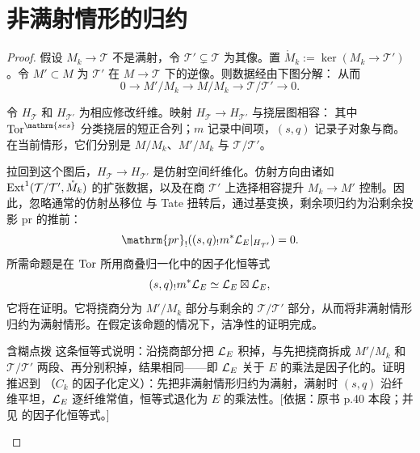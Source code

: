 \section{非满射情形的归约}\label{sec:6.6}
\begin{proof}
假设 $M_k\to\mathcal T$ 不是满射，令 $\mathcal T'\subsetneq\mathcal T$ 为其像。置 $\mathring M_k:=\ker(M_k\to\mathcal T')$。令 $M'\subset M$ 为 $\mathcal T'$ 在 $M\to\mathcal T$ 下的逆像。则数据经由下图分解：
从而
\[0\longrightarrow M'/M_k\longrightarrow M/M_k\longrightarrow\mathcal T/\mathcal T'\longrightarrow0.\]

令 $H_{\mathcal T}$ 和 $H_{\mathcal T'}$ 为相应修改纤维。映射 $H_{\mathcal T}\to H_{\mathcal T'}$ 与挠层图相容：
其中 $\Tor^{\mathrm{ses}}$ 分类挠层的短正合列；$m$ 记录中间项，$(s,q)$ 记录子对象与商。在当前情形，它们分别是 $M/M_k$、$M'/M_k$ 与 $\mathcal T/\mathcal T'$。

拉回到这个图后，$H_{\mathcal T}\to H_{\mathcal T'}$ 是仿射空间纤维化。仿射方向由诸如 $\operatorname{Ext}^1(\mathcal T/\mathcal T',\mathring M_k)$ 的扩张数据，以及在商 $\mathcal T'$ 上选择相容提升 $M_k\to M'$ 控制。因此，忽略通常的仿射丛移位
与 Tate 扭转后，通过基变换，剩余项归约为沿剩余投影 $\mathrm{pr}$ 的推前：
\[\mathrm{pr}_!((s,q)_!m^*\cL_E|_{H_{\mathcal T'}})=0.\]
所需命题是在 $\operatorname{Tor}$ 所用商叠归一化中的因子化恒等式
\[(s,q)_!m^*\mathcal{L}_E\simeq\mathcal{L}_E\boxtimes\mathcal{L}_E,\]
它将在证明。它将挠商分为 $M'/M_k$ 部分与剩余的 $\mathcal T/\mathcal T'$ 部分，从而将非满射情形归约为满射情形。在假定该命题的情况下，洁净性的证明完成。
\begin{transnote}{含糊点拨}
这条恒等式说明：沿挠商部分把 $\mathcal{L}_E$ 积掉，与先把挠商拆成 $M'/M_k$ 和 $\mathcal T/\mathcal T'$ 两段、再分别积掉，结果相同——即 $\mathcal{L}_E$ 关于 $E$ 的乘法是因子化的。证明推迟到 （$C_k$ 的因子化定义）：先把非满射情形归约为满射，满射时 $(s,q)$ 沿纤维平坦，$\mathcal{L}_E$ 逐纤维常值，恒等式退化为 $E$ 的乘法性。[依据：原书 p.40 本段；并见  的因子化恒等式。]
\end{transnote}
\end{proof}
\endgroup
